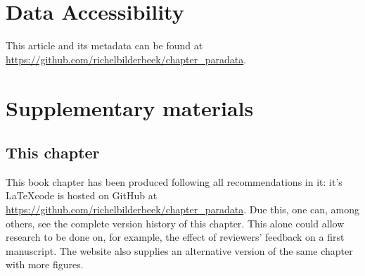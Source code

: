 \section{Data Accessibility}

This article and its metadata can be found at 
\url{https://github.com/richelbilderbeek/chapter_paradata}.




\iffalse

\newpage
\appendix
\section{Supplementary materials}

\renewcommand{\thefigure}{S\arabic{figure}}
\setcounter{figure}{0}

\renewcommand{\thetable}{S\arabic{table}}
\setcounter{table}{0}

\subsection{This chapter}

This book chapter has been produced following all recommendations in it:
it's \LaTeX code is hosted on GitHub 
at \url{https://github.com/richelbilderbeek/chapter_paradata}.
Due this, one can, among others, see the complete version history of this chapter.
This alone could allow research to be done on, for example,
the effect of reviewers' feedback on a first manuscript.
The website also supplies an alternative version of the same chapter
with more figures.

